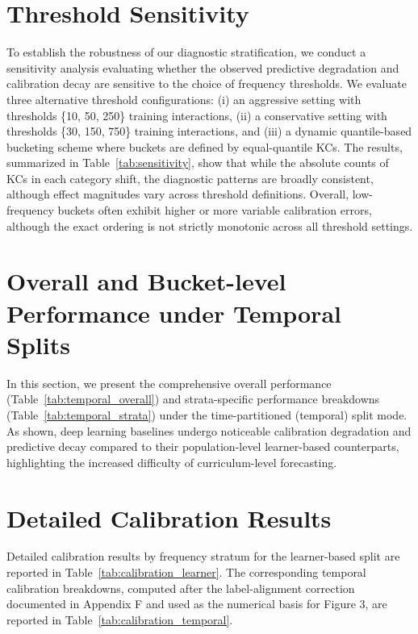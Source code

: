 \section{Threshold Sensitivity}
\label{app:sensitivity}
To establish the robustness of our diagnostic stratification, we conduct a sensitivity analysis evaluating whether the observed predictive degradation and calibration decay are sensitive to the choice of frequency thresholds. We evaluate three alternative threshold configurations: (i) an aggressive setting with thresholds \{10, 50, 250\} training interactions, (ii) a conservative setting with thresholds \{30, 150, 750\} training interactions, and (iii) a dynamic quantile-based bucketing scheme where buckets are defined by equal-quantile KCs. The results, summarized in Table~\ref{tab:sensitivity}, show that while the absolute counts of KCs in each category shift, the diagnostic patterns are broadly consistent, although effect magnitudes vary across threshold definitions. Overall, low-frequency buckets often exhibit higher or more variable calibration errors, although the exact ordering is not strictly monotonic across all threshold settings.


\FloatBarrier

\section{Overall and Bucket-level Performance under Temporal Splits}
\label{app:temporal_performance}
In this section, we present the comprehensive overall performance (Table~\ref{tab:temporal_overall}) and strata-specific performance breakdowns (Table~\ref{tab:temporal_strata}) under the time-partitioned (temporal) split mode. As shown, deep learning baselines undergo noticeable calibration degradation and predictive decay compared to their population-level learner-based counterparts, highlighting the increased difficulty of curriculum-level forecasting.




\clearpage
\section{Detailed Calibration Results}
\label{app:calibration_performance}
Detailed calibration results by frequency stratum for the learner-based split are reported in Table~\ref{tab:calibration_learner}. The corresponding temporal calibration breakdowns, computed after the label-alignment correction documented in Appendix F and used as the numerical basis for Figure 3, are reported in Table~\ref{tab:calibration_temporal}.

